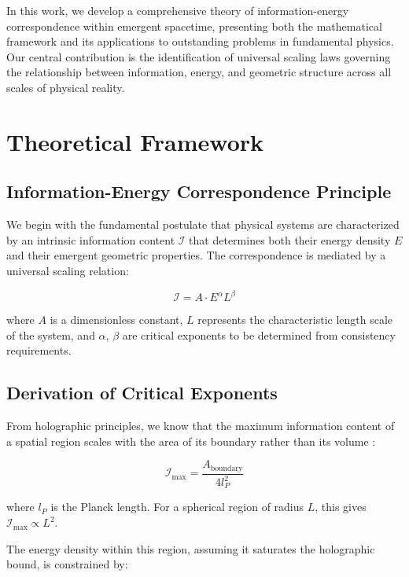 \documentclass[11pt,a4paper]{article}
\begin{document}
In this work, we develop a comprehensive theory of information-energy correspondence within emergent spacetime, presenting both the mathematical framework and its applications to outstanding problems in fundamental physics. Our central contribution is the identification of universal scaling laws governing the relationship between information, energy, and geometric structure across all scales of physical reality.

\section{Theoretical Framework}

\subsection{Information-Energy Correspondence Principle}

We begin with the fundamental postulate that physical systems are characterized by an intrinsic information content $\mathcal{I}$ that determines both their energy density $E$ and their emergent geometric properties. The correspondence is mediated by a universal scaling relation:

\begin{equation}
\mathcal{I} = A \cdot E^{\alpha} L^{\beta}
\label{eq:main_correspondence}
\end{equation}

where $A$ is a dimensionless constant, $L$ represents the characteristic length scale of the system, and $\alpha$, $\beta$ are critical exponents to be determined from consistency requirements.

\subsection{Derivation of Critical Exponents}

From holographic principles, we know that the maximum information content of a spatial region scales with the area of its boundary rather than its volume \cite{bousso2002holographic}:

\begin{equation}
\mathcal{I}_{\text{max}} = \frac{A_{\text{boundary}}}{4 l_P^2}
\end{equation}

where $l_P$ is the Planck length. For a spherical region of radius $L$, this gives $\mathcal{I}_{\text{max}} \propto L^2$.

The energy density within this region, assuming it saturates the holographic bound, is constrained by:
\end{document}
